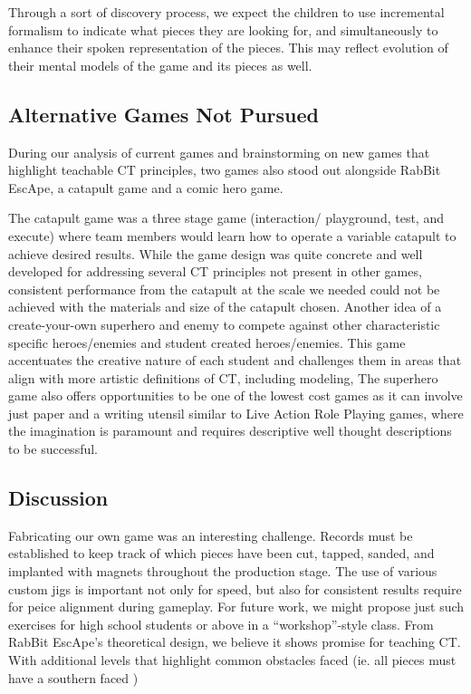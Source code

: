 \documentclass{acm_proc_article-sp}
\begin{document}
Through a sort of discovery process, we expect the children to use incremental formalism \cite{shipman1999formality} to indicate what pieces they are looking for, and simultaneously to enhance their spoken representation of the pieces. 
This may reflect evolution of their mental models of the game and its pieces as well. 

\subsection{Alternative Games Not Pursued}
\label{sec:terminated_games}
During our analysis of current games and brainstorming on new games that highlight teachable CT principles, two games also stood out alongside RabBit EscApe, a catapult game and a comic hero game.

The catapult game was a three stage game (interaction/ playground, test, and execute) where team members would learn how to operate a variable catapult to achieve desired results.
While the game design was quite concrete and well developed for addressing several CT principles not present in other games, consistent performance from the catapult at the scale we needed could not be achieved with the materials and size of the catapult chosen.
Another idea of a create-your-own superhero and enemy to compete against other characteristic specific heroes/enemies and student created heroes/enemies.
This game accentuates the creative nature of each student and challenges them in areas that align with more artistic definitions of CT, including modeling, 
The superhero game also offers opportunities to be one of the lowest cost games as it can involve just paper and a writing utensil similar to Live Action Role Playing games, where the imagination is paramount and requires descriptive well thought descriptions to be successful.

\subsection{Discussion}
\label{sec:discussion}
\sloppy Fabricating our own game was an interesting challenge.
Records must be established to keep track of which pieces have been cut, tapped, sanded, and implanted with magnets throughout the production stage.
The use of various custom jigs is important not only for speed, but also for consistent results require for peice alignment during gameplay.
For future work, we might propose just such exercises for high school students or above in a ``workshop''-style class.
From RabBit EscApe's theoretical design, we believe it shows promise for teaching CT. With additional levels that highlight common obstacles faced (ie. all pieces must have a southern faced )
\end{document}
